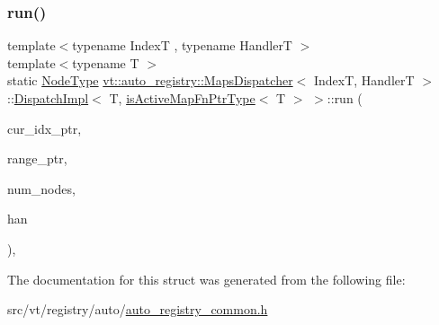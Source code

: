 \subsubsection{\texorpdfstring{run()}{run()}}
{\footnotesize\ttfamily template$<$typename IndexT , typename HandlerT $>$ \\
template$<$typename T $>$ \\
static \hyperlink{namespacevt_a866da9d0efc19c0a1ce79e9e492f47e2}{Node\+Type} \hyperlink{structvt_1_1auto__registry_1_1_maps_dispatcher}{vt\+::auto\+\_\+registry\+::\+Maps\+Dispatcher}$<$ IndexT, HandlerT $>$\+::\hyperlink{structvt_1_1auto__registry_1_1_maps_dispatcher_1_1_dispatch_impl}{Dispatch\+Impl}$<$ T, \hyperlink{structvt_1_1auto__registry_1_1_maps_dispatcher_a24cb754617b982102f2d0e9ff7ddb021}{is\+Active\+Map\+Fn\+Ptr\+Type}$<$ T $>$ $>$\+::run (\begin{DoxyParamCaption}\item[{IndexT $\ast$}]{cur\+\_\+idx\+\_\+ptr,  }\item[{IndexT $\ast$}]{range\+\_\+ptr,  }\item[{\hyperlink{namespacevt_a866da9d0efc19c0a1ce79e9e492f47e2}{Node\+Type}}]{num\+\_\+nodes,  }\item[{HandlerT}]{han }\end{DoxyParamCaption})\hspace{0.3cm}{\ttfamily [inline]}, {\ttfamily [static]}}



The documentation for this struct was generated from the following file\+:\begin{DoxyCompactItemize}
\item 
src/vt/registry/auto/\hyperlink{auto__registry__common_8h}{auto\+\_\+registry\+\_\+common.\+h}\end{DoxyCompactItemize}
